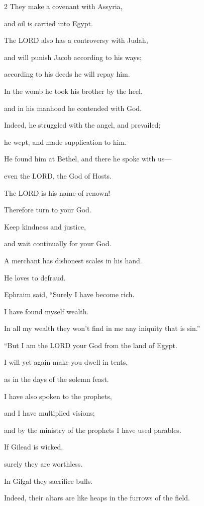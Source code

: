 \begin{multicols}{2}
They make a covenant with Assyria,

and oil is carried into Egypt.

\myverse{}The LORD also has a controversy with Judah,

and will punish Jacob according to his ways;

according to his deeds he will repay him.

\myverse{}In the womb he took his brother by the heel,

and in his manhood he contended with God.

\myverse{}Indeed, he struggled with the angel, and prevailed;

he wept, and made supplication to him.

He found him at Bethel, and there he spoke with us—

\myverse{}even the LORD, the God of Hosts.

The LORD is his name of renown!

\myverse{}Therefore turn to your God.

Keep kindness and justice,

and wait continually for your God.


\vspace{\baselineskip} \myverse{}A merchant has dishonest scales in his hand.

He loves to defraud.

\myverse{}Ephraim said, “Surely I have become rich.

I have found myself wealth.

In all my wealth they won’t find in me any iniquity that is sin.”


\vspace{\baselineskip} \myverse{}“But I am the LORD your God from the land of Egypt.

I will yet again make you dwell in tents,

as in the days of the solemn feast.

\myverse{}I have also spoken to the prophets,

and I have multiplied visions;

and by the ministry of the prophets I have used parables.

\myverse{}If Gilead is wicked,

surely they are worthless.

In Gilgal they sacrifice bulls.

Indeed, their altars are like heaps in the furrows of the field.


\end{multicols}
